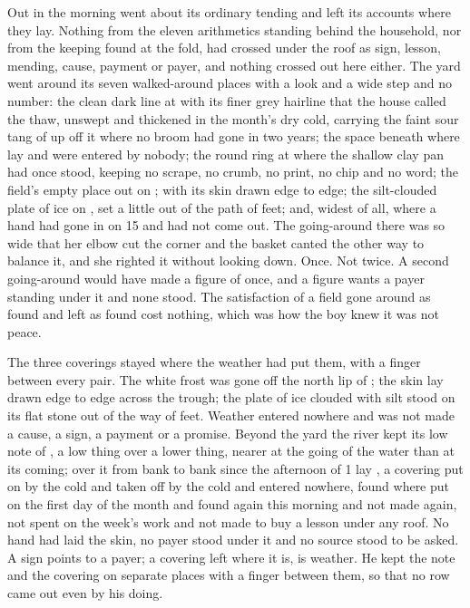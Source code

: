 Out in  the morning went about its ordinary tending and left its accounts where they lay. Nothing from the eleven arithmetics standing behind the household, nor from the keeping found at the fold, had crossed under the roof as sign, lesson, mending, cause, payment or payer, and nothing crossed out here either. The yard went around its seven walked-around places with a look and a wide step and no number: the clean dark line at  with its finer grey hairline that the house called the thaw, unswept and thickened in the month's dry cold, carrying the faint sour tang of  up off it where no broom had gone in two years; the space beneath  where  lay and were entered by nobody; the round ring at  where the shallow clay pan had once stood, keeping no scrape, no crumb, no print, no chip and no word; the field's empty place out on ;  with its skin drawn edge to edge; the silt-clouded plate of ice on , set a little out of the path of feet; and, widest of all,  where a hand had gone in on  15 and had not come out. The going-around there was so wide that her elbow cut the corner and the basket canted the other way to balance it, and she righted it without looking down. Once. Not twice. A second going-around would have made a figure of once, and a figure wants a payer standing under it and none stood. The satisfaction of a field gone around as found and left as found cost nothing, which was how the boy knew it was not peace.

The three coverings stayed where the weather had put them, with a finger between every pair. The white frost was gone off the north lip of ; the skin lay drawn edge to edge across the trough; the plate of ice clouded with silt stood on its flat stone out of the way of feet. Weather entered nowhere and was not made a cause, a sign, a payment or a promise. Beyond the yard the river kept its low note of , a low thing over a lower thing, nearer at the going of the water than at its coming; over it from bank to bank since the afternoon of  1 lay , a covering put on by the cold and taken off by the cold and entered nowhere, found where put on the first day of the month and found again this morning and not made again, not spent on the week's work and not made to buy a lesson under any roof. No hand had laid the skin, no payer stood under it and no source stood to be asked. A sign points to a payer; a covering left where it is, is weather. He kept the note and the covering on separate places with a finger between them, so that no row came out even by his doing.

